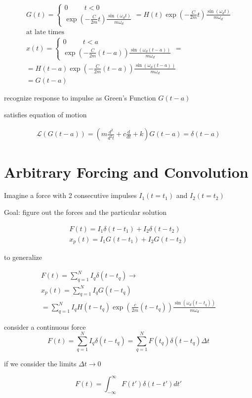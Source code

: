 \documentclass[fleqn]{report}
\newcommand{\hp}{\hspace{1cm}}
\newcommand{\equations} [1] {
\begin{gather*}
#1
\end{gather*}
}
\begin{document}
\equations{
    G(t) = \begin{cases}
    0 \hp t < 0 \\ 
    \exp(- \frac{C}{2m} t) \frac{\sin(\omega_d t)}{m \omega_d}
    \end{cases}
    =
    H(t) 
    \exp(- \frac{C}{2m} t) \frac{\sin(\omega_d t)}{m \omega_d}
    \\
    \textrm{at late times }
    \\
    x(t) = \begin{cases}
    0 \hp t < a \\ 
    \exp(- \frac{C}{2m} (t - a)) \frac{\sin(\omega_d (t - a))}{m \omega_d}
    \end{cases}
    =
    \\
    =
    H(t - a) 
    \exp(- \frac{C}{2m} (t - a)) \frac{\sin(\omega_d (t - a))}{m \omega_d}
    \\
    = G(t - a)
}

recognize response to impulse as Green's Function $G(t - a)$

satisfies equation of motion 
\equations{ 
    \mathcal L(G(t - a)) = 
    (m \frac{d^2}{d^2 t} + c \frac{d}{dt} + k) 
    G(t - a) = \delta(t - a)
}

\section{Arbitrary Forcing and Convolution}
Imagine a force with 2 consecutive impulses 
$I_1(t = t_1)$ and $I_2(t = t_2)$

Goal: figure out the forces and the particular solution 

\equations{
    F(t) = I_1 \delta(t - t_1) + I_2 \delta(t - t_2)
    \\
    x_p(t) = I_1 G(t - t_1) + I_2 G(t - t_2)
}

to generalize 
\equations{
    F(t) = \sum^N_{q = 1} I_q \delta(t - t_q)
    \rightarrow
    \\
    x_p(t) = 
    \sum^N_{q = 1} I_q G(t - t_q)
    \\
    =
    \sum^N_{q = 1} I_q H(t - t_q) \exp(\frac{c}{2m}(t - t_q)) 
    \frac{\sin(\omega_d (t - t_q))}{m \omega_d}  
}

consider a continuous force 
\[
F(t) = \sum^{N}_{q = 1} I_q \delta(t - t_q)
=
\sum^{N}_{q = 1} F(t_q) \delta(t - t_q) \Delta t
\]

if we consider the limits $\Delta t \to 0$

\[
F(t) = \int^{\infty}_{- \infty} F(t') \delta(t - t') dt'
\]
\end{document}
